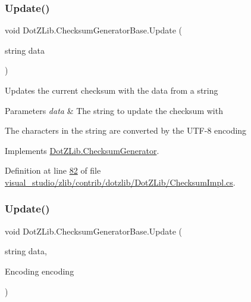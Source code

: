 \subsubsection{\texorpdfstring{Update()}{Update()}\hspace{0.1cm}{\footnotesize\ttfamily [6/8]}}
{\footnotesize\ttfamily void Dot\+Z\+Lib.\+Checksum\+Generator\+Base.\+Update (\begin{DoxyParamCaption}\item[{string}]{data }\end{DoxyParamCaption})\hspace{0.3cm}{\ttfamily [inline]}}



Updates the current checksum with the data from a string 


\begin{DoxyParams}{Parameters}
{\em data} & The string to update the checksum with\\
\hline
\end{DoxyParams}


The characters in the string are converted by the U\+T\+F-\/8 encoding

Implements \hyperlink{interface_dot_z_lib_1_1_checksum_generator_ac5a728d2dd56479b429648177607fd39}{Dot\+Z\+Lib.\+Checksum\+Generator}.



Definition at line \hyperlink{visual__studio_2zlib_2contrib_2dotzlib_2_dot_z_lib_2_checksum_impl_8cs_source_l00082}{82} of file \hyperlink{visual__studio_2zlib_2contrib_2dotzlib_2_dot_z_lib_2_checksum_impl_8cs_source}{visual\+\_\+studio/zlib/contrib/dotzlib/\+Dot\+Z\+Lib/\+Checksum\+Impl.\+cs}.

\mbox{\label{class_dot_z_lib_1_1_checksum_generator_base_ad8e1adfbbfcc12ab74c772f3292bfee3}} 
\subsubsection{\texorpdfstring{Update()}{Update()}\hspace{0.1cm}{\footnotesize\ttfamily [7/8]}}
{\footnotesize\ttfamily void Dot\+Z\+Lib.\+Checksum\+Generator\+Base.\+Update (\begin{DoxyParamCaption}\item[{string}]{data,  }\item[{Encoding}]{encoding }\end{DoxyParamCaption})\hspace{0.3cm}{\ttfamily [inline]}}



